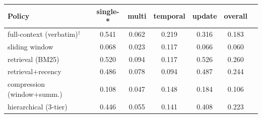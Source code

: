 \begin{tabular}{lcccccc}
\toprule
Policy & single-* & multi & temporal & update & overall \\
\midrule
full-context (verbatim)$^{\dagger}$ & 0.541 & 0.062 & 0.219 & 0.316 & 0.183 \\
sliding window & 0.068 & 0.023 & 0.117 & 0.066 & 0.060 \\
retrieval (BM25) & 0.520 & 0.094 & 0.117 & 0.526 & 0.260 \\
retrieval+recency & 0.486 & 0.078 & 0.094 & 0.487 & 0.244 \\
compression (window+summ.) & 0.108 & 0.047 & 0.148 & 0.184 & 0.106 \\
hierarchical (3-tier) & 0.446 & 0.055 & 0.141 & 0.408 & 0.223 \\
\bottomrule
\end{tabular}